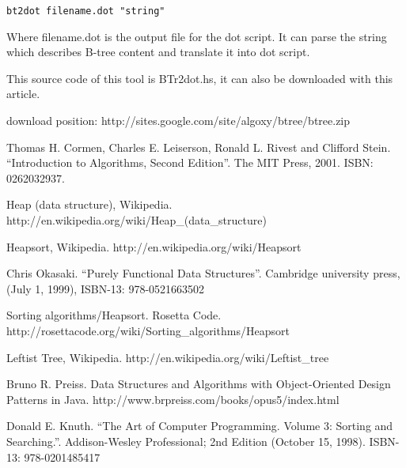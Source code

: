 \documentclass{article}
\begin{document}
\begin{verbatim}
bt2dot filename.dot "string"
\end{verbatim}

Where filename.dot is the output file for the dot script. It can
parse the string which describes B-tree content and translate it 
into dot script.

This source code of this tool is BTr2dot.hs, it can also be downloaded 
with this article.

download position: http://sites.google.com/site/algoxy/btree/btree.zip

\begin{thebibliography}{99}

Thomas H. Cormen, Charles E. Leiserson, Ronald L. Rivest and Clifford Stein. ``Introduction to Algorithms, Second Edition''. The MIT Press, 2001. ISBN: 0262032937.

Heap (data structure), Wikipedia. http://en.wikipedia.org/wiki/Heap\_(data\_structure)

Heapsort, Wikipedia. http://en.wikipedia.org/wiki/Heapsort

Chris Okasaki. ``Purely Functional Data Structures''. Cambridge university press, (July 1, 1999), ISBN-13: 978-0521663502

Sorting algorithms/Heapsort. Rosetta Code. http://rosettacode.org/wiki/Sorting\_algorithms/Heapsort

Leftist Tree, Wikipedia. http://en.wikipedia.org/wiki/Leftist\_tree

Bruno R. Preiss. Data Structures and Algorithms with Object-Oriented Design Patterns in Java. http://www.brpreiss.com/books/opus5/index.html

Donald E. Knuth. ``The Art of Computer Programming. Volume 3: Sorting and Searching.''. Addison-Wesley Professional; 
2nd Edition (October 15, 1998). ISBN-13: 978-0201485417

\end{thebibliography}

\ifx\wholebook\relax \else
\end{document}

